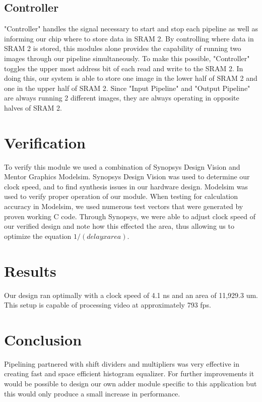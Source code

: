 \documentclass[10pt]{IEEEtran}
\begin{document}
\subsection*{Controller}
"Controller" handles the signal necessary to start and stop each pipeline as well as informing our chip where to store data in SRAM 2. By controlling where data in SRAM 2 is stored, this modules alone provides the capability of running two images through our pipeline simultaneously. To make this possible, "Controller" toggles the upper most address bit of each read and write to the SRAM 2. In doing this, our system is able to store one image in the lower half of SRAM 2 and one in the upper half of SRAM 2. Since "Input Pipeline" and "Output Pipeline" are always running 2 different images, they are always operating in opposite halves of SRAM 2.

\section{Verification}
To verify this module we used a combination of Synopsys Design Vision and Mentor Graphics Modelsim. Synopsys Design Vision was used to determine our clock speed, and to find synthesis issues in our hardware design. Modelsim was used to verify proper operation of our module. When testing for calculation accuracy in Modelsim, we used numerous test vectors that were generated by proven working C code. Through Synopsys, we were able to adjust clock speed of our verified design and note how this effected the area, thus allowing us to optimize the equation $1/(delayxarea)$.

\section{Results}
Our design ran optimally with a clock speed of 4.1 ns and an area of 11,929.3 um. This setup is capable of processing video at approximately 793 fps. 

\section{Conclusion}
Pipelining partnered with shift dividers and multipliers was very effective in creating fast and space efficient histogram equalizer. For further improvements it would be possible to design our own adder module specific to this application but this would only produce a small increase in performance.
\end{document}
